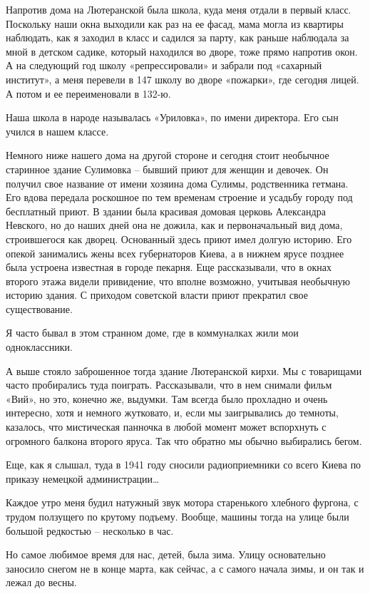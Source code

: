 Напротив дома на Лютеранской была школа, куда меня отдали в первый класс.
Поскольку наши окна выходили как раз на ее фасад, мама могла из квартиры
наблюдать, как я заходил в класс и садился за парту, как раньше наблюдала за
мной в детском садике, который находился во дворе, тоже прямо напротив окон. А
на следующий год школу «репрессировали» и забрали под «сахарный институт», а
меня перевели в 147 школу во дворе «пожарки», где сегодня лицей. А потом и ее
переименовали в 132-ю.

Наша школа в народе называлась «Уриловка», по имени директора. Его сын учился в
нашем классе.

Немного ниже нашего дома на другой стороне и сегодня стоит необычное старинное
здание Сулимовка – бывший приют для женщин и девочек. Он получил свое название
от имени хозяина дома Сулимы, родственника гетмана. Его вдова передала
роскошное по тем временам строение и усадьбу городу под бесплатный приют. В
здании была красивая домовая церковь Александра Невского, но до наших дней она
не дожила, как и первоначальный вид дома, строившегося как дворец. Основанный
здесь приют имел долгую историю. Его опекой занимались жены всех губернаторов
Киева, а в нижнем ярусе позднее была устроена известная в городе пекарня. Еще
рассказывали, что в окнах второго этажа видели привидение, что вполне возможно,
учитывая необычную историю здания. С приходом советской власти приют прекратил
свое существование.

Я часто бывал в этом странном доме, где в коммуналках жили мои одноклассники. 

А выше стояло заброшенное тогда здание Лютеранской кирхи. Мы с товарищами часто
пробирались туда поиграть. Рассказывали, что в нем снимали фильм «Вий», но это,
конечно же, выдумки. Там всегда было прохладно и очень интересно, хотя и
немного жутковато, и, если мы заигрывались до темноты, казалось, что
мистическая панночка в любой момент может вспорхнуть с огромного балкона
второго яруса. Так что обратно мы обычно выбирались бегом.

Еще, как я слышал, туда в 1941 году сносили радиоприемники со всего Киева по
приказу немецкой администрации…

Каждое утро меня будил натужный звук мотора старенького хлебного фургона, с
трудом ползущего по крутому подъему. Вообще, машины тогда на улице были большой
редкостью – несколько в час.

Но самое любимое время для нас, детей, была зима. Улицу основательно заносило
снегом не в конце марта, как сейчас, а с самого начала зимы, и он так и лежал
до весны.

